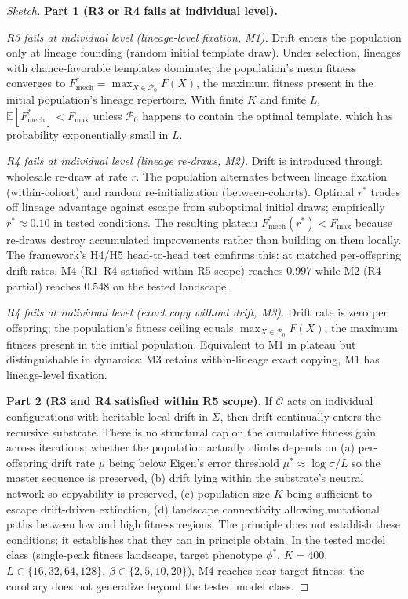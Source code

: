 \documentclass[11pt]{article}
\theoremstyle{plain}
\theoremstyle{definition}
\newcommand{\Op}{\mathcal{O}}
\begin{document}
\begin{proof}[Sketch]
\textbf{Part 1 (R3 or R4 fails at individual level).}

\emph{R3 fails at individual level (lineage-level fixation, M1).} Drift enters the population only at lineage founding (random initial template draw). Under selection, lineages with chance-favorable templates dominate; the population's mean fitness converges to $F^*_{\mathrm{mech}} = \max_{X \in \mathcal{P}_0} F(X)$, the maximum fitness present in the initial population's lineage repertoire. With finite $K$ and finite $L$, $\mathbb{E}[F^*_{\mathrm{mech}}] < F_{\max}$ unless $\mathcal{P}_0$ happens to contain the optimal template, which has probability exponentially small in $L$.

\emph{R4 fails at individual level (lineage re-draws, M2).} Drift is introduced through wholesale re-draw at rate $r$. The population alternates between lineage fixation (within-cohort) and random re-initialization (between-cohorts). Optimal $r^*$ trades off lineage advantage against escape from suboptimal initial draws; empirically $r^* \approx 0.10$ in tested conditions. The resulting plateau $F^*_{\mathrm{mech}}(r^*) < F_{\max}$ because re-draws destroy accumulated improvements rather than building on them locally. The framework's H4/H5 head-to-head test confirms this: at matched per-offspring drift rates, M4 (R1--R4 satisfied within R5 scope) reaches $0.997$ while M2 (R4 partial) reaches $0.548$ on the tested landscape.

\emph{R4 fails at individual level (exact copy without drift, M3).} Drift rate is zero per offspring; the population's fitness ceiling equals $\max_{X \in \mathcal{P}_0} F(X)$, the maximum fitness present in the initial population. Equivalent to M1 in plateau but distinguishable in dynamics: M3 retains within-lineage exact copying, M1 has lineage-level fixation.

\textbf{Part 2 (R3 and R4 satisfied within R5 scope).} If $\Op$ acts on individual configurations with heritable local drift in $\Sigma$, then drift continually enters the recursive substrate. There is no structural cap on the cumulative fitness gain across iterations; whether the population actually climbs depends on (a) per-offspring drift rate $\mu$ being below Eigen's error threshold $\mu^* \approx \log \sigma / L$ \citep{Eigen1971, EigenMcCaskillSchuster1989} so the master sequence is preserved, (b) drift lying within the substrate's neutral network \citep{Wagner2005, Wagner2011} so copyability is preserved, (c) population size $K$ being sufficient to escape drift-driven extinction, (d) landscape connectivity allowing mutational paths between low and high fitness regions. The principle does not establish these conditions; it establishes that they can in principle obtain. In the tested model class (single-peak fitness landscape, target phenotype $\phi^*$, $K = 400$, $L \in \{16, 32, 64, 128\}$, $\beta \in \{2, 5, 10, 20\}$), M4 reaches near-target fitness; the corollary does not generalize beyond the tested model class.
\end{proof}
\end{document}

